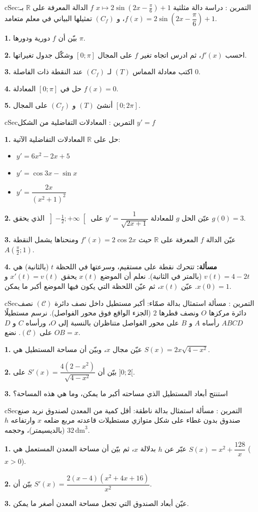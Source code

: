 \documentclass[12pt,a4paper]{article}
\newenvironment{BOX}[2]{\begin{otherlanguage}{english}\begin{arbox}{#1}{#2}}{\end{arbox}\end{otherlanguage}}
\newcounter{exo}
\newenvironment{tamrin}[1]{\stepcounter{exo}\begin{BOX}{cSec}{التمرين \theexo: #1}}{\end{BOX}}
\newcommand{\R}{\mathbb{R}}
\newenvironment{sq}{\begin{itemize}[leftmargin=2.4em,itemsep=3pt]}{\end{itemize}}
\newcommand{\qa}{\item[(أ)]}\newcommand{\qb}{\item[(ب)]}\newcommand{\qc}{\item[(جـ)]}\newcommand{\qd}{\item[(د)]}\newcommand{\qe}{\item[(هـ)]}
\newcommand{\QQ}[1]{\par\smallskip\textbf{#1.} }
\begin{document}
\begin{tamrin}{دراسة دالة مثلثية $x\mapsto2\sin\left(2x-\frac{\pi}{6}\right)+1$}
$f$ الدالة المعرفة على $\R$ بـ: $f(x)=2\sin\left(2x-\dfrac{\pi}{6}\right)+1$، و $(C_f)$ تمثيلها البياني في معلم متعامد.
\QQ{1} بيّن أن $f$ دورية ودورها $\pi$.
\QQ{2} احسب $f'(x)$، ثم ادرس اتجاه تغير $f$ على المجال $[0;\pi]$ وشكّل جدول تغيراتها.
\QQ{3} اكتب معادلة المماس $(T)$ لـ $(C_f)$ عند النقطة ذات الفاصلة $0$.
\QQ{4} حل في $[0;\pi]$ المعادلة $f(x)=0$.
\QQ{5} أنشئ $(T)$ و $(C_f)$ على المجال $[0;2\pi]$.
\end{tamrin}

\begin{tamrin}{المعادلات التفاضلية من الشكل $y'=f$}
\QQ{1} حل على $\R$ المعادلات التفاضلية الآتية:
\begin{sq}
\qa $y'=6x^{2}-2x+5$ \qb $y'=\cos3x-\sin x$ \qc $y'=\dfrac{2x}{\left(x^{2}+1\right)^{2}}$
\end{sq}
\QQ{2} عيّن الحل $g$ للمعادلة $y'=\dfrac{1}{\sqrt{2x+1}}$ على $\left]-\frac12;+\infty\right[$ الذي يحقق $g(0)=3$.
\QQ{3} عيّن الدالة $f$ المعرفة على $\R$ حيث $f'(x)=2\cos2x$ ومنحناها يشمل النقطة $A\left(\frac{\pi}{2};1\right)$.
\QQ{4} \textbf{مسألة:} تتحرك نقطة على مستقيم، وسرعتها في اللحظة $t$ (بالثانية) هي $v(t)=4-2t$ (بالمتر في الثانية). نعلم أن الموضع $x(t)$ يحقق $x'(t)=v(t)$ و $x(0)=1$. عيّن $x(t)$، ثم عيّن اللحظة التي يكون فيها الموضع أكبر ما يمكن.
\end{tamrin}

\begin{tamrin}{مسألة استمثال بدالة صمّاء: أكبر مستطيل داخل نصف دائرة}
$(\mathcal{C})$ نصف دائرة مركزها $O$ ونصف قطرها $2$ (الجزء الواقع فوق محور الفواصل). نرسم مستطيلًا $ABCD$ رأساه $A$ و $B$ على محور الفواصل متناظران بالنسبة إلى $O$، ورأساه $C$ و $D$ على $(\mathcal{C})$. نضع $OB=x$.
\QQ{1} عيّن مجال $x$، وبيّن أن مساحة المستطيل هي $S(x)=2x\sqrt{4-x^{2}}$.
\QQ{2} بيّن أن $S'(x)=\dfrac{4\left(2-x^{2}\right)}{\sqrt{4-x^{2}}}$ على $]0;2[$.
\QQ{3} استنتج أبعاد المستطيل الذي مساحته أكبر ما يمكن، وما هي هذه المساحة؟
\end{tamrin}

\begin{tamrin}{مسألة استمثال بدالة ناطقة: أقل كمية من المعدن لصندوق}
نريد صنع صندوق بدون غطاء على شكل متوازي مستطيلات قاعدته مربع ضلعه $x$ وارتفاعه $h$ (بالديسيمتر)، وحجمه $32\,\text{dm}^{3}$.
\QQ{1} عبّر عن $h$ بدلالة $x$، ثم بيّن أن مساحة المعدن المستعمل هي $S(x)=x^{2}+\dfrac{128}{x}$ ($x>0$).
\QQ{2} بيّن أن $S'(x)=\dfrac{2(x-4)\left(x^{2}+4x+16\right)}{x^{2}}$.
\QQ{3} عيّن أبعاد الصندوق التي تجعل مساحة المعدن أصغر ما يمكن.
\end{tamrin}
\end{document}
